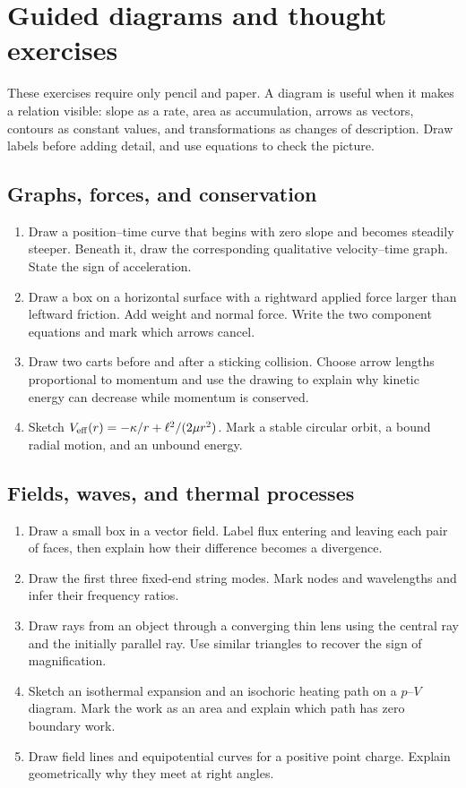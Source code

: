 \documentclass[11pt,oneside]{book}
\theoremstyle{reviewstyle}
\begin{document}
\chapter{Guided diagrams and thought exercises}
These exercises require only pencil and paper. A diagram is useful when it makes a relation visible: slope as a rate, area as accumulation, arrows as vectors, contours as constant values, and transformations as changes of description. Draw labels before adding detail, and use equations to check the picture.

\section{Graphs, forces, and conservation}
\begin{enumerate}
\item Draw a position--time curve that begins with zero slope and becomes steadily steeper. Beneath it, draw the corresponding qualitative velocity--time graph. State the sign of acceleration.
\item Draw a box on a horizontal surface with a rightward applied force larger than leftward friction. Add weight and normal force. Write the two component equations and mark which arrows cancel.
\item Draw two carts before and after a sticking collision. Choose arrow lengths proportional to momentum and use the drawing to explain why kinetic energy can decrease while momentum is conserved.
\item Sketch $V_{\rm eff}(r)=-\kappa/r+\ell^2/(2\mu r^2)$. Mark a stable circular orbit, a bound radial motion, and an unbound energy.
\end{enumerate}

\section{Fields, waves, and thermal processes}
\begin{enumerate}
\item Draw a small box in a vector field. Label flux entering and leaving each pair of faces, then explain how their difference becomes a divergence.
\item Draw the first three fixed-end string modes. Mark nodes and wavelengths and infer their frequency ratios.
\item Draw rays from an object through a converging thin lens using the central ray and the initially parallel ray. Use similar triangles to recover the sign of magnification.
\item Sketch an isothermal expansion and an isochoric heating path on a $p$--$V$ diagram. Mark the work as an area and explain which path has zero boundary work.
\item Draw field lines and equipotential curves for a positive point charge. Explain geometrically why they meet at right angles.
\end{enumerate}
\end{document}
